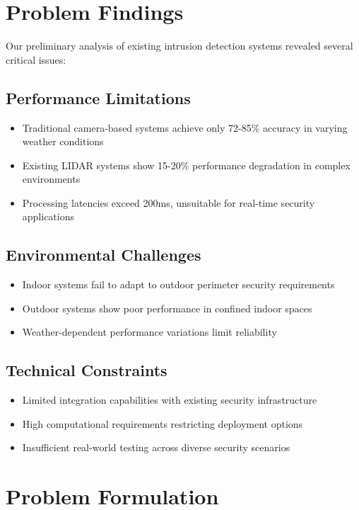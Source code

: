 \documentclass[conference]{IEEEtran}
\begin{document}
\section{Problem Findings}

Our preliminary analysis of existing intrusion detection systems revealed several critical issues:

\subsection{Performance Limitations}
\begin{itemize}
\item Traditional camera-based systems achieve only 72-85\% accuracy in varying weather conditions
\item Existing LIDAR systems show 15-20\% performance degradation in complex environments
\item Processing latencies exceed 200ms, unsuitable for real-time security applications
\end{itemize}

\subsection{Environmental Challenges}
\begin{itemize}
\item Indoor systems fail to adapt to outdoor perimeter security requirements
\item Outdoor systems show poor performance in confined indoor spaces
\item Weather-dependent performance variations limit reliability
\end{itemize}

\subsection{Technical Constraints}
\begin{itemize}
\item Limited integration capabilities with existing security infrastructure
\item High computational requirements restricting deployment options
\item Insufficient real-world testing across diverse security scenarios
\end{itemize}

\section{Problem Formulation}
\end{document}
